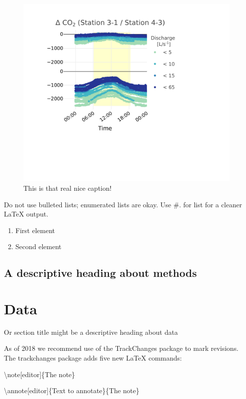 \documentclass[draft,linenumbers]{agujournal2018}
\begin{document}
\begin{figure}[h]
\includegraphics{StreamFluxArticle_files/figure-latex/filt14PpmPlot-1} \caption{This is that real nice caption!}\label{fig:filt14PpmPlot}
\end{figure}

Do not use bulleted lists; enumerated lists are okay. Use \#. for list
for a cleaner LaTeX output.

\begin{enumerate}
\item
  First element
\item
  Second element
\end{enumerate}

\subsection{A descriptive heading about methods}

\section{Data}

Or section title might be a descriptive heading about data

As of 2018 we recommend use of the TrackChanges package to mark
revisions. The trackchanges package adds five new LaTeX commands:

\textbackslash{}note{[}editor{]}\{The note\}

\textbackslash{}annote{[}editor{]}\{Text to annotate\}\{The note\}
\end{document}
